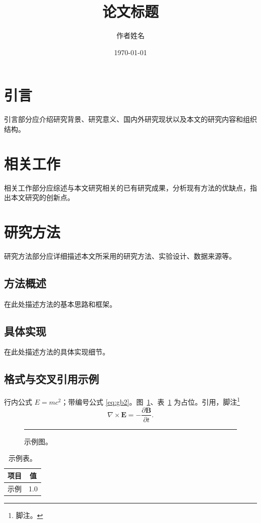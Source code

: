 \documentclass[12pt,a4paper,twocolumn]{article}
\title{论文标题}
\author{作者姓名}
\date{\today}
\begin{document}

\section{引言}
引言部分应介绍研究背景、研究意义、国内外研究现状以及本文的研究内容和组织结构。

\section{相关工作}
相关工作部分应综述与本文研究相关的已有研究成果，分析现有方法的优缺点，指出本文研究的创新点。

\section{研究方法}
研究方法部分应详细描述本文所采用的研究方法、实验设计、数据来源等。

\subsection{方法概述}
在此处描述方法的基本思路和框架。

\subsection{具体实现}
在此处描述方法的具体实现细节。

\subsection{格式与交叉引用示例}
行内公式 $E=mc^2$；带编号公式 \eqref{eq:gb2}。图~\ref{fig:gb2}、表~\ref{tab:gb2} 为占位。引用\cite{ref1}，脚注\footnote{脚注。}
\begin{equation}
  \label{eq:gb2}
  \nabla \times \mathbf{E} = -\frac{\partial \mathbf{B}}{\partial t}.
\end{equation}
\begin{figure}[htbp]
  \centering
  \rule{3cm}{1.8cm}
  \caption{示例图。}
  \label{fig:gb2}
\end{figure}
\begin{table}[htbp]
  \centering
  \caption{示例表。}
  \label{tab:gb2}
  \begin{tabular}{lc}
    \toprule
    项目 & 值 \\
    \midrule
    示例 & 1.0 \\
    \bottomrule
  \end{tabular}
\end{table}
\end{document}
